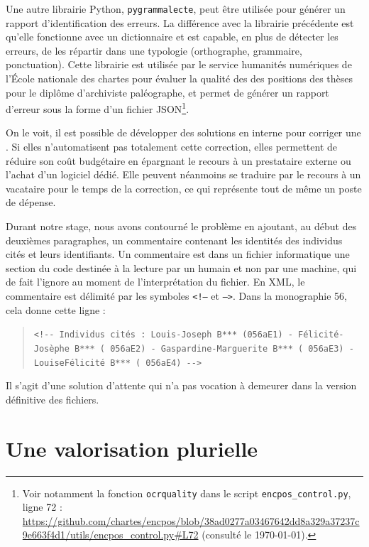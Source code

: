 Une autre librairie Python, \texttt{pygrammalecte}, peut être utilisée pour générer un rapport d'identification des erreurs. La différence avec la librairie précédente est qu'elle fonctionne avec un dictionnaire et est capable, en plus de détecter les erreurs, de les répartir dans une typologie (orthographe, grammaire, ponctuation). Cette librairie est utilisée par le service humanités numériques de l'École nationale des chartes pour évaluer la qualité des \ocr{} des positions des thèses pour le diplôme d'archiviste paléographe, et permet de générer un rapport d'erreur sous la forme d'un fichier JSON\footnote{Voir notamment la fonction \texttt{ocrquality} dans le script \texttt{encpos\_control.py}, ligne 72 : \url{https://github.com/chartes/encpos/blob/38ad0277a03467642dd8a329a37237c9e663f4d1/utils/encpos_control.py\#L72} (consulté le \today).}.

On le voit, il est possible de développer des solutions en interne pour corriger une \ocr. Si elles n'automatisent pas totalement cette correction, elles permettent de réduire son coût budgétaire en épargnant le recours à un prestataire externe ou l'achat d'un logiciel dédié. Elle peuvent néanmoins se traduire par le recours à un vacataire pour le temps de la correction, ce qui représente tout de même un poste de dépense.

Durant notre stage, nous avons contourné le problème en ajoutant, au début des deuxièmes paragraphes, un commentaire contenant les identités des individus cités et leurs identifiants. Un commentaire est dans un fichier informatique une section du code destinée à la lecture par un humain et non par une machine, qui de fait l'ignore au moment de l'interprétation du fichier. En XML, le commentaire est délimité par les symboles \texttt{<!--} et \texttt{-->}. Dans la monographie \no{} 56, cela donne cette ligne :

\begin{quote}
    \texttt{<!-{}- Individus cités : Louis-Joseph B*** (\no{}056aE1) - Félicité-Josèphe B*** (\no{} 056aE2) - Gaspardine-Marguerite B*** (\no{} 056aE3) - Louise\-Félicité B*** (\no{} 056aE4) -{}->}
\end{quote}

Il s'agit d'une solution d'attente qui n'a pas vocation à demeurer dans la version définitive des fichiers.

\chapter{Une valorisation plurielle}

